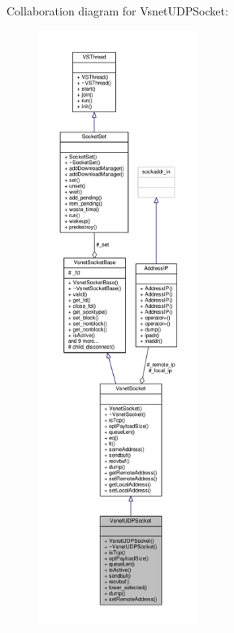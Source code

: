 Collaboration diagram for Vsnet\+U\+D\+P\+Socket\+:
\nopagebreak
\begin{figure}[H]
\begin{center}
\leavevmode
\includegraphics[height=550pt]{da/d9f/classVsnetUDPSocket__coll__graph}
\end{center}
\end{figure}
